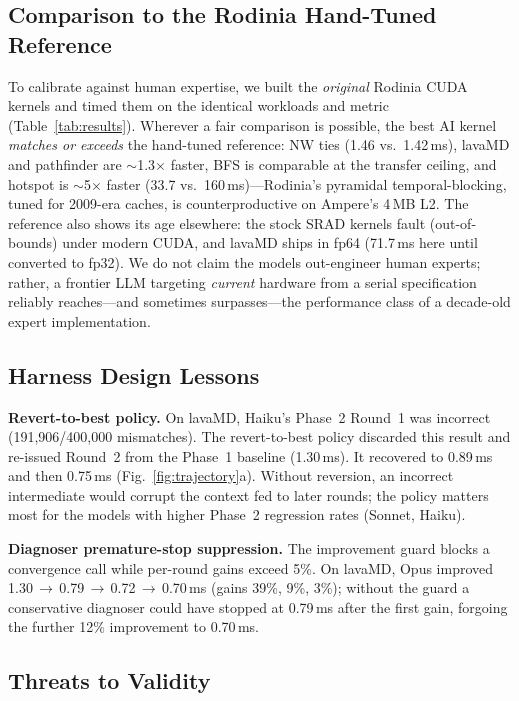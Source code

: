 \documentclass[conference]{IEEEtran}
\begin{document}
\subsection{Comparison to the Rodinia Hand-Tuned Reference}

To calibrate against human expertise, we built the \emph{original} Rodinia CUDA
kernels and timed them on the identical workloads and metric
(Table~\ref{tab:results}). Wherever a fair comparison is possible, the best AI
kernel \emph{matches or exceeds} the hand-tuned reference: NW ties (1.46 vs.\
1.42\,ms), lavaMD and pathfinder are $\sim$1.3$\times$ faster, BFS is comparable
at the transfer ceiling, and hotspot is $\sim$5$\times$ faster (33.7 vs.\
160\,ms)---Rodinia's pyramidal temporal-blocking, tuned for 2009-era caches, is
counterproductive on Ampere's 4\,MB L2. The reference also shows its age
elsewhere: the stock SRAD kernels fault (out-of-bounds) under modern CUDA, and
lavaMD ships in fp64 (71.7\,ms here until converted to fp32). We do not claim the
models out-engineer human experts; rather, a frontier LLM targeting
\emph{current} hardware from a serial specification reliably reaches---and
sometimes surpasses---the performance class of a decade-old expert
implementation.

\subsection{Harness Design Lessons}

\textbf{Revert-to-best policy.}
On lavaMD, Haiku's Phase~2 Round~1 was incorrect (191,906/400,000
mismatches). The revert-to-best policy discarded this result and
re-issued Round~2 from the Phase~1 baseline (1.30\,ms).
It recovered to 0.89\,ms and then 0.75\,ms (Fig.~\ref{fig:trajectory}a). Without
reversion, an incorrect intermediate would corrupt the context fed to later
rounds; the policy matters most for the models with higher Phase~2 regression
rates (Sonnet, Haiku).

\textbf{Diagnoser premature-stop suppression.}
The improvement guard blocks a convergence call while per-round gains exceed 5\%.
On lavaMD, Opus improved 1.30\,$\to$\,0.79\,$\to$\,0.72\,$\to$\,0.70\,ms (gains
39\%, 9\%, 3\%); without the guard a conservative diagnoser could have stopped at
0.79\,ms after the first gain, forgoing the further 12\% improvement to 0.70\,ms.

\subsection{Threats to Validity}
\label{sec:threats}
\end{document}
